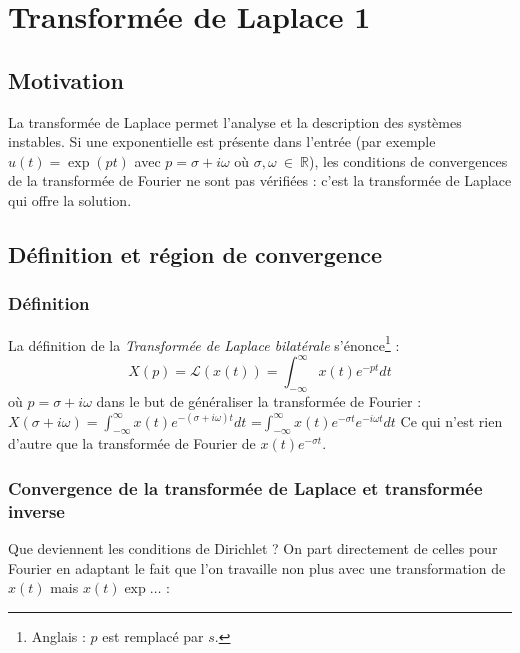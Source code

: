 \chapter{Transformée de Laplace 1}
\section{Motivation}
La transformée de Laplace permet l'analyse et la description des systèmes instables.
Si une exponentielle est présente dans l'entrée (par exemple $u(t) = \exp(pt)$ avec
$p = \sigma + i\omega$ où $\sigma,\omega\ \in\ \mathbb{R}$), les
conditions de convergences de la transformée de Fourier ne sont pas vérifiées : c'est
la transformée de Laplace qui offre la solution.


\section{Définition et région de convergence}
\subsection{Définition}
La définition de la \textit{Transformée de Laplace bilatérale} s'énonce\footnote{
Anglais : $p$ est remplacé par $s$.} :
\begin{equation}
	X(p) = \mathcal{L}(x(t)) = \int_{-\infty}^\infty x(t)e^{-pt}dt
\end{equation}
où $p= \sigma + i\omega$ dans le but de généraliser la transformée de Fourier :
$	X(\sigma+i\omega) = \int_{-\infty}^\infty x(t)e^{-(\sigma+i\omega)t}dt$ =$ 
\int_{-\infty}^\infty x(t)e^{-\sigma t}e^{-i\omega t}dt
$%
Ce qui n'est rien d'autre que la transformée de Fourier de $x(t)e^{-\sigma t}$.


\subsection{Convergence de la transformée de Laplace et transformée inverse}
Que deviennent les conditions de Dirichlet ? On part directement de celles pour
Fourier en adaptant le fait que l'on travaille non plus avec une transformation 
de $x(t)$ mais $x(t)\exp\dots$ :
	
